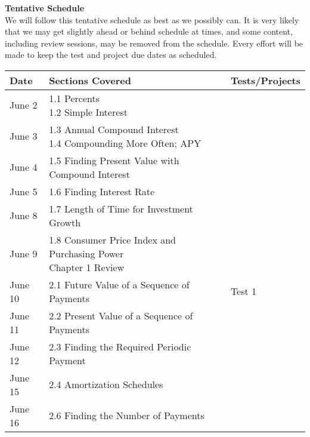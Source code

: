 \documentclass[addpoints,12pt]{exam}
\begin{document}
\noindent \textbf{Tentative Schedule} \\
We will follow this tentative schedule as best as we possibly can. It is very likely that we may get slightly ahead or behind schedule at times, and some content, including review sessions, may be removed from the schedule. Every effort will be made to keep the test and project due dates as scheduled. 
\begin{table}[bht] \sffamily \centering
    \begin{tabular}{|l|l|l|}
    \hline
    \textbf{Date}      & \textbf{Sections Covered}                                                           & \textbf{Tests/Projects} \\ \hline
    June 2    & \parbox[t]{5cm}{1.1 Percents \\ 1.2 Simple Interest   }                                      & ~               \\ \hline
    June 3   & \parbox[t]{8cm}{ 1.3 Annual Compound Interest\\1.4 Compounding More Often; APY}              & ~               \\ \hline
    June 4   & 1.5 Finding Present Value with Compound Interest                           & ~               \\ \hline
    June 5   & 1.6 Finding Interest Rate                                                  & ~               \\ \hline
    June 8   & 1.7 Length of Time for Investment Growth                                   & ~               \\ \hline
    June 9   &  \parbox[t]{9cm}{1.8 Consumer Price Index and Purchasing Power\\Chapter 1 Review}            & ~               \\ \hline
    June 10   & 2.1 Future Value of a Sequence of Payments                                 & Test 1          \\ \hline
    June 11   & 2.2 Present Value of a Sequence of Payments                                & ~               \\ \hline
    June 12   & 2.3 Finding the Required Periodic Payment                                & ~               \\ \hline
    June 15   & 2.4 Amortization Schedules                                                 & ~               \\ \hline
    June 16   &  2.6 Finding the Number of Payments                                & ~               \\ \hline

\end{tabular}
\end{table}
\end{document}
